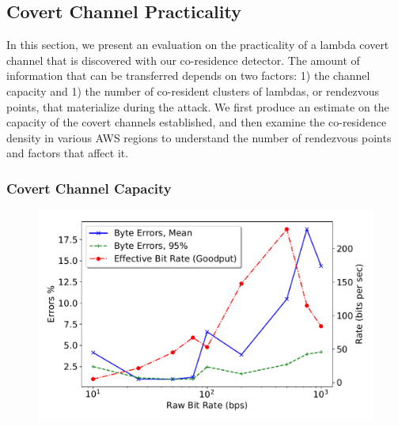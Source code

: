 \subsection{Covert Channel Practicality}
\label{sec:study}

In this section, we present an evaluation on the practicality of a lambda covert
channel that is discovered with our co-residence detector.  The amount of
information that can be transferred depends on two factors: 1) the channel
capacity and 1) the number of co-resident clusters of lambdas, or rendezvous
points, that materialize during the attack.  We first produce an estimate on the
capacity of the covert channels established, and then examine the co-residence
density in various AWS regions to understand the number of rendezvous points and
factors that affect it.

\subsubsection{Covert Channel Capacity}

\begin{figure}[!t]
  \includegraphics[width=.99\linewidth]{fig/channel_rate_3gb.pdf}
  \caption{
\label{fig:channel}}
\end{figure}

